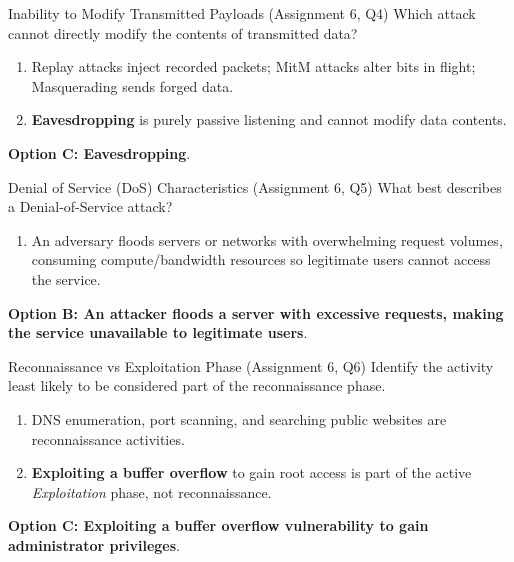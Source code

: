 \begin{solved}{Inability to Modify Transmitted Payloads (Assignment 6, Q4)}
\Given Which attack cannot directly modify the contents of transmitted data?
\Steps
\begin{enumerate}[leftmargin=*]
  \item Replay attacks inject recorded packets; MitM attacks alter bits in flight; Masquerading sends forged data.
  \item \textbf{Eavesdropping} is purely passive listening and cannot modify data contents.
\end{enumerate}
\Answer \textbf{Option C: Eavesdropping}.
\end{solved}

\begin{solved}{Denial of Service (DoS) Characteristics (Assignment 6, Q5)}
\Given What best describes a Denial-of-Service attack?
\Steps
\begin{enumerate}[leftmargin=*]
  \item An adversary floods servers or networks with overwhelming request volumes, consuming compute/bandwidth resources so legitimate users cannot access the service.
\end{enumerate}
\Answer \textbf{Option B: An attacker floods a server with excessive requests, making the service unavailable to legitimate users}.
\end{solved}

\begin{solved}{Reconnaissance vs Exploitation Phase (Assignment 6, Q6)}
\Given Identify the activity least likely to be considered part of the reconnaissance phase.
\Steps
\begin{enumerate}[leftmargin=*]
  \item DNS enumeration, port scanning, and searching public websites are reconnaissance activities.
  \item \textbf{Exploiting a buffer overflow} to gain root access is part of the active \emph{Exploitation} phase, not reconnaissance.
\end{enumerate}
\Answer \textbf{Option C: Exploiting a buffer overflow vulnerability to gain administrator privileges}.
\end{solved}

